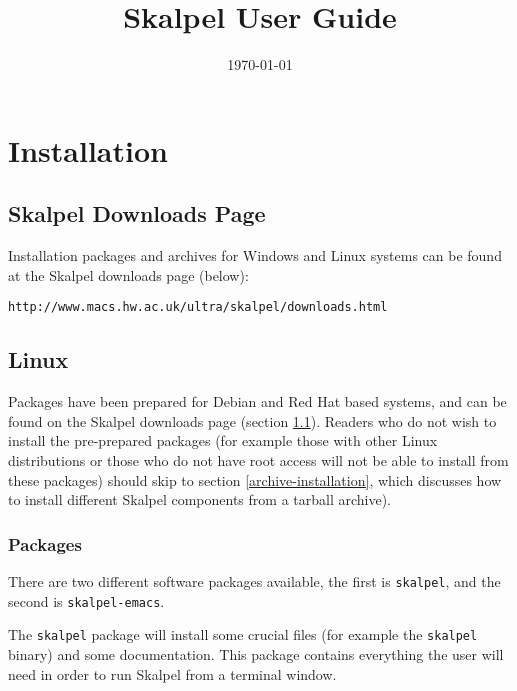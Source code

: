 \documentclass{report}
\title{Skalpel User Guide}
\date{\today}
\begin{document}
\maketitle
\vspace{110mm}

\newpage

\tableofcontents

\newpage

\chapter {Installation}

\section {Skalpel Downloads Page}
\label{skalpel-downloads-page}

Installation packages and archives for Windows and Linux systems can
be found at the Skalpel downloads page (below):

\begin{center}\texttt{http://www.macs.hw.ac.uk/ultra/skalpel/downloads.html}\end{center}

\section {Linux}

Packages have been prepared for Debian and Red Hat based systems, and
can be found on the Skalpel downloads page (section
\ref{skalpel-downloads-page}). Readers who do not wish to install the
pre-prepared packages (for example those with other Linux
distributions or those who do not have root access will not be able to
install from these packages) should skip to section \ref{archive-installation},
which discusses how to install different Skalpel components from a
tarball archive).

\subsection {Packages}

There are two different software packages available, the first is
\texttt{skalpel}, and the second is \texttt{skalpel-emacs}.

The \texttt{skalpel} package will install some crucial files (for
example the \texttt{skalpel} binary) and some documentation. This
package contains everything the user will need in order to run Skalpel
from a terminal window.
\end{document}
